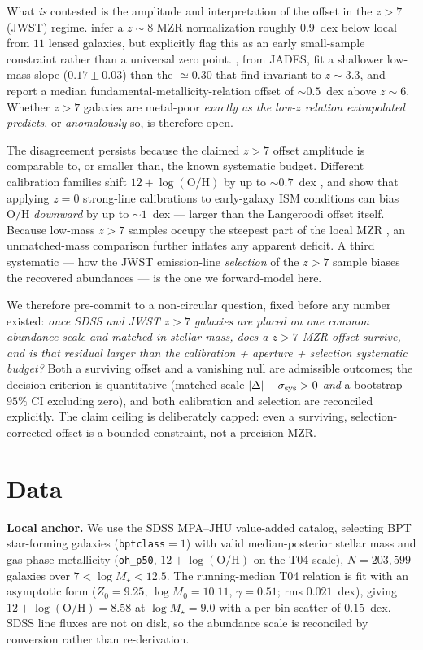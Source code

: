 \documentclass[twocolumn]{aastex631}
\begin{document}
What \emph{is} contested is the amplitude and interpretation of the offset in the $z>7$ (JWST) regime. \citet{Langeroodi2023} infer a $z\sim8$ MZR normalization roughly $0.9$~dex below local from $11$ lensed galaxies, but explicitly flag this as an early small-sample constraint rather than a universal zero point. \citet{Curti2024}, from JADES, fit a shallower low-mass slope ($0.17\pm0.03$) than the $\simeq0.30$ that \citet{Sanders2021} find invariant to $z\sim3.3$, and report a median fundamental-metallicity-relation offset of $\sim0.5$~dex above $z\sim6$. Whether $z>7$ galaxies are metal-poor \emph{exactly as the low-$z$ relation extrapolated predicts}, or \emph{anomalously} so, is therefore open.

The disagreement persists because the claimed $z>7$ offset amplitude is comparable to, or smaller than, the known systematic budget. Different calibration families shift $12+\log(\mathrm{O/H})$ by up to $\sim0.7$~dex \citep{KewleyEllison2008}, and \citet{Hirschmann2023} show that applying $z=0$ strong-line calibrations to early-galaxy ISM conditions can bias $\mathrm{O/H}$ \emph{downward} by up to $\sim1$~dex --- larger than the Langeroodi offset itself. Because low-mass $z>7$ samples occupy the steepest part of the local MZR \citep{Tremonti2004}, an unmatched-mass comparison further inflates any apparent deficit. A third systematic --- how the JWST emission-line \emph{selection} of the $z>7$ sample biases the recovered abundances --- is the one we forward-model here.

We therefore pre-commit to a non-circular question, fixed before any number existed: \emph{once SDSS and JWST $z>7$ galaxies are placed on one common abundance scale and matched in stellar mass, does a $z>7$ MZR offset survive, and is that residual larger than the calibration + aperture + selection systematic budget?} Both a surviving offset and a vanishing null are admissible outcomes; the decision criterion is quantitative (matched-scale $|\Delta|-\sigma_{\rm sys}>0$ \emph{and} a bootstrap $95\%$ CI excluding zero), and both calibration and selection are reconciled explicitly. The claim ceiling is deliberately capped: even a surviving, selection-corrected offset is a bounded constraint, not a precision MZR.

\section{Data}
\textbf{Local anchor.} We use the SDSS MPA--JHU value-added catalog, selecting BPT star-forming galaxies (\texttt{bptclass}$=1$) with valid median-posterior stellar mass and gas-phase metallicity (\texttt{oh\_p50}, $12+\log(\mathrm{O/H})$ on the T04 scale), $N=203{,}599$ galaxies over $7<\log M_\star<12.5$. The running-median T04 relation is fit with an asymptotic form ($Z_0=9.25$, $\log M_0=10.11$, $\gamma=0.51$; rms $0.021$~dex), giving $12+\log(\mathrm{O/H})=8.58$ at $\log M_\star=9.0$ with a per-bin scatter of $0.15$~dex. SDSS line fluxes are not on disk, so the abundance scale is reconciled by conversion rather than re-derivation.
\end{document}
